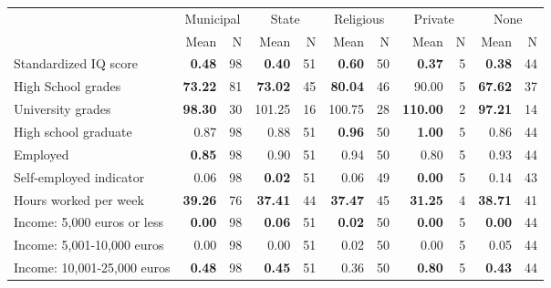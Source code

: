 \begin{tabular}{l r r r r r r r r r r}
\toprule
& \multicolumn{2}{c}{Municipal} & \multicolumn{2}{c}{State} & \multicolumn{2}{c}{Religious} & \multicolumn{2}{c}{Private} & \multicolumn{2}{c}{None} \\
& \scriptsize Mean & \scriptsize N & \scriptsize Mean & \scriptsize N & \scriptsize Mean & \scriptsize N & \scriptsize Mean & \scriptsize N & \scriptsize Mean & \scriptsize N \\
\midrule
Standardized IQ score & \textbf{     0.48} &        98 & \textbf{     0.40} &        51 & \textbf{     0.60} &        50 & \textbf{     0.37} &         5 & \textbf{     0.38} &        44 \\
High School grades & \textbf{    73.22} &        81 & \textbf{    73.02} &        45 & \textbf{    80.04} &        46 &     90.00 &         5 & \textbf{    67.62} &        37 \\
University grades & \textbf{    98.30} &        30 &    101.25 &        16 &    100.75 &        28 & \textbf{   110.00} &         2 & \textbf{    97.21} &        14 \\
High school graduate &      0.87 &        98 &      0.88 &        51 & \textbf{     0.96} &        50 & \textbf{     1.00} &         5 &      0.86 &        44 \\
Employed & \textbf{     0.85} &        98 &      0.90 &        51 &      0.94 &        50 &      0.80 &         5 &      0.93 &        44 \\
Self-employed indicator &      0.06 &        98 & \textbf{     0.02} &        51 &      0.06 &        49 & \textbf{     0.00} &         5 &      0.14 &        43 \\
Hours worked per week & \textbf{    39.26} &        76 & \textbf{    37.41} &        44 & \textbf{    37.47} &        45 & \textbf{    31.25} &         4 & \textbf{    38.71} &        41 \\
Income: 5,000 euros or less & \textbf{     0.00} &        98 & \textbf{     0.06} &        51 & \textbf{     0.02} &        50 & \textbf{     0.00} &         5 & \textbf{     0.00} &        44 \\
Income: 5,001-10,000 euros &      0.00 &        98 &      0.00 &        51 &      0.02 &        50 &      0.00 &         5 &      0.05 &        44 \\
Income: 10,001-25,000 euros & \textbf{     0.48} &        98 & \textbf{     0.45} &        51 &      0.36 &        50 & \textbf{     0.80} &         5 & \textbf{     0.43} &        44 \\

\end{tabular}
